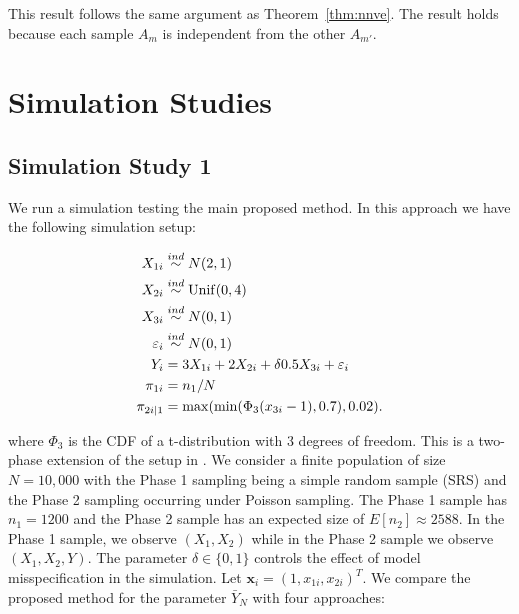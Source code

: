 \documentclass[12pt]{article}
\renewcommand{\bf}[1]{\mathbf{#1}}
\begin{document}
This result follows the same argument as Theorem~\eqref{thm:nnve}. The result
holds because each sample $A_m$ is independent from the other $A_{m'}$.

\section{Simulation Studies}

\subsection{Simulation Study 1}

We run a simulation testing the main proposed method. In this approach we have the
following simulation setup:

$$
\begin{aligned}
X_{1i} &\stackrel{ind}{\sim} N(2, 1) \\
X_{2i} &\stackrel{ind}{\sim} \rm{Unif}(0, 4) \\
X_{3i} &\stackrel{ind}{\sim} N(0, 1) \\
\varepsilon_i &\stackrel{ind}{\sim} N(0, 1) \\
Y_{i} &= 3 X_{1i} + 2 X_{2i} + \delta 0.5 X_{3i} + \varepsilon_i \\
\pi_{1i} &= n_1 / N \\
\pi_{2i|1} &= \max(\min(\Phi_3(x_{3i} - 1), 0.7), 0.02).
\end{aligned}
$$

where $\Phi_3$ is the CDF of a t-distribution with 3 degrees of freedom.
This is a two-phase extension of the setup in \cite{kwon2024debiased}. We
consider a finite population of size $N = 10,000$ with the Phase 1 sampling
being a simple random sample (SRS) and the 
Phase 2 sampling occurring under Poisson sampling. The Phase 1 sample has
$n_1 = 1200$ and the Phase 2 sample has an expected size of
$E[n_2] \approx 2588$. In the Phase 1 sample, we observe 
$(X_1, X_2)$ while in the Phase 2 sample we observe $(X_1, X_2, Y)$. 
The parameter $\delta \in \{0, 1\}$ controls the effect of model misspecification
in the simulation. Let $\bf x_i = (1, x_{1i}, x_{2i})^T$. We compare the
proposed method for the parameter $\bar Y_N$ with four approaches:
\end{document}
